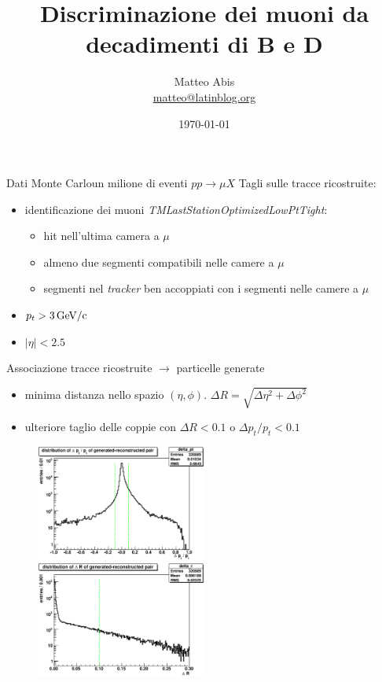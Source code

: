 \documentclass[italian]{beamer}
\title{Discriminazione dei muoni da decadimenti di B e D}
\author{Matteo Abis \\
\url{matteo@latinblog.org}}
\institute{Università degli Studi di Padova\\
Scuola Galileiana di Studi Superiori}
\date{\today}
\begin{document}
\begin{frame}
    \titlepage
\end{frame}

\begin{frame}{Dati Monte Carlo}{un milione di eventi $pp \to \mu X$}
Tagli sulle tracce ricostruite:
\begin{itemize}
    \item identificazione dei muoni \emph{TMLastStationOptimizedLowPtTight}:
        \begin{itemize}
            \item hit nell'ultima camera a $\mu$
            \item almeno due segmenti compatibili nelle camere a $\mu$
            \item segmenti nel \emph{tracker} ben accoppiati con i segmenti
                nelle camere a $\mu$
        \end{itemize}
    \item $p_t > \unit[3]{GeV/c}$
    \item $|\eta| < 2.5$
\end{itemize}
\end{frame}

\begin{frame}{Associazione tracce ricostruite $\to$ particelle generate}
\begin{itemize}
    \item minima distanza nello spazio $(\eta, \phi)$. $\Delta R =
        \sqrt{\Delta \eta^{2} + \Delta \phi^{2}}$
    \item ulteriore taglio delle coppie con $\Delta R < 0.1$ o $\Delta p_t /
        p_t < 0.1$
\end{itemize}
\begin{figure}[h]
    \includegraphics[width=0.5\textwidth]{crea_istogrammi/delta_pt.eps}
    \includegraphics[width=0.5\textwidth]{crea_istogrammi/delta_r.eps}
\end{figure}
\end{frame}
\end{document}
